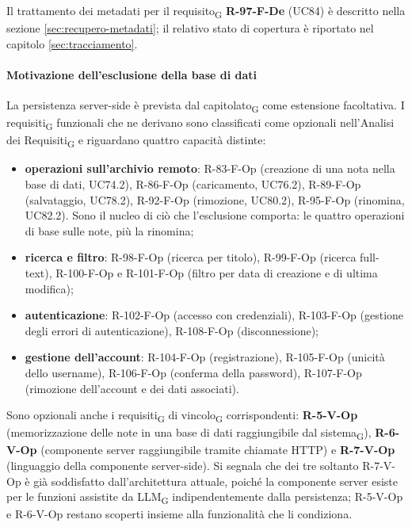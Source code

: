 \documentclass[a4paper, 10pt]{article}
\begin{document}
Il trattamento dei metadati per il requisito\textsubscript{G} \textbf{R-97-F-De} (UC84) è descritto nella sezione \ref{sec:recupero-metadati}; il relativo stato di copertura è riportato nel capitolo \ref{sec:tracciamento}.

\paragraph{Motivazione dell'esclusione della base di dati}
La persistenza server-side è prevista dal capitolato\textsubscript{G} come estensione facoltativa. I requisiti\textsubscript{G} funzionali che ne derivano sono classificati come opzionali nell'Analisi dei Requisiti\textsubscript{G} e riguardano quattro capacità distinte:

\begin{itemize}
    \setlength{\itemsep}{0pt}
    \item \textbf{operazioni sull'archivio remoto}: R-83-F-Op (creazione di una nota nella base di dati, UC74.2), R-86-F-Op (caricamento, UC76.2), R-89-F-Op (salvataggio, UC78.2), R-92-F-Op (rimozione, UC80.2), R-95-F-Op (rinomina, UC82.2). Sono il nucleo di ciò che l'esclusione comporta: le quattro operazioni di base sulle note, più la rinomina;
    \item \textbf{ricerca e filtro}: R-98-F-Op (ricerca per titolo), R-99-F-Op (ricerca full-text), R-100-F-Op e R-101-F-Op (filtro per data di creazione e di ultima modifica);
    \item \textbf{autenticazione}: R-102-F-Op (accesso con credenziali), R-103-F-Op (gestione degli errori di autenticazione), R-108-F-Op (disconnessione);
    \item \textbf{gestione dell'account}: R-104-F-Op (registrazione), R-105-F-Op (unicità dello username), R-106-F-Op (conferma della password), R-107-F-Op (rimozione dell'account e dei dati associati).
\end{itemize}

\noindent Sono opzionali anche i requisiti\textsubscript{G} di vincolo\textsubscript{G} corrispondenti: \textbf{R-5-V-Op} (memorizzazione delle note in una base di dati raggiungibile dal sistema\textsubscript{G}), \textbf{R-6-V-Op} (componente server raggiungibile tramite chiamate HTTP) e \textbf{R-7-V-Op} (linguaggio della componente server-side). Si segnala che dei tre soltanto R-7-V-Op è già soddisfatto dall'architettura attuale, poiché la componente server esiste per le funzioni assistite da LLM\textsubscript{G} indipendentemente dalla persistenza; R-5-V-Op e R-6-V-Op restano scoperti insieme alla funzionalità che li condiziona.
\end{document}
